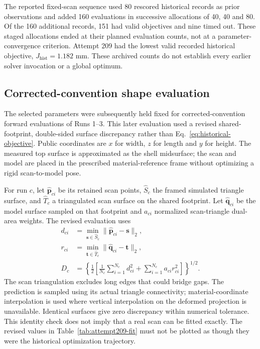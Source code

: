 \documentclass[11pt]{article}
\begin{document}
The reported fixed-scan sequence used 80 rescored historical records as prior observations and added 160 evaluations in successive allocations of 40, 40 and 80. Of the 160 additional records, 151 had valid objectives and nine timed out. These staged allocations ended at their planned evaluation counts, not at a parameter-convergence criterion. Attempt 209 had the lowest valid recorded historical objective, $J_{\mathrm{hist}}=1.182$ mm. These archived counts do not establish every earlier solver invocation or a global optimum.

\subsection{Corrected-convention shape evaluation}
The selected parameters were subsequently held fixed for corrected-convention forward evaluations of Runs 1--3. This later evaluation used a revised shared-footprint, double-sided surface discrepancy rather than Eq.~\eqref{eq:historical-objective}. Public coordinates are $x$ for width, $z$ for length and $y$ for height. The measured top surface is approximated as the shell midsurface; the scan and model are placed in the prescribed material-reference frame without optimizing a rigid scan-to-model pose.

For run $c$, let $\widehat{\mathbf p}_{ci}$ be its retained scan points, $\widehat S_c$ the framed simulated triangle surface, and $\widehat T_c$ a triangulated scan surface on the shared footprint. Let $\widehat{\mathbf q}_{ci}$ be the model surface sampled on that footprint and $a_{ci}$ normalized scan-triangle dual-area weights. The revised evaluation uses
\begin{align}
 d_{ci}&=\min_{\mathbf s\in\widehat S_c}\lVert\widehat{\mathbf p}_{ci}-\mathbf s\rVert_2,\\
 r_{ci}&=\min_{\mathbf t\in\widehat T_c}\lVert\widehat{\mathbf q}_{ci}-\mathbf t\rVert_2,\\
 D_c&=\left\{\tfrac12\left[\frac{1}{N_c}\sum_{i=1}^{N_c}d_{ci}^{2}+\sum_{i=1}^{N_c}a_{ci}r_{ci}^{2}\right]\right\}^{1/2}.
 \label{eq:revised-evaluation}
\end{align}
The scan triangulation excludes long edges that could bridge gaps. The prediction is sampled using its actual triangle connectivity; material-coordinate interpolation is used where vertical interpolation on the deformed projection is unavailable. Identical surfaces give zero discrepancy within numerical tolerance. This identity check does not imply that a real scan can be fitted exactly. The revised values in Table~\ref{tab:attempt209-fit} must not be plotted as though they were the historical optimization trajectory.
\end{document}
